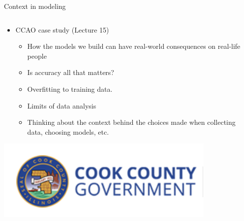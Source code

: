 \documentclass[aspectratio=169]{../latex_main/tntbeamer}  %
\begin{document}
	
	\begin{frame}{Context in modeling}
	          \begin{columns}
	            \begin{column}{.6\textwidth}
	            \vspace{.75cm}
	            \begin{itemize}
	                \item CCAO case study (Lecture 15)
	                \begin{itemize}
	                    \item How the models we build can have real-world consequences on real-life people
	                    \item Is accuracy all that matters?
	                    \item Overfitting to training data.
	                    \item Limits of data analysis
	                    \item Thinking about the context behind the choices made when collecting data, choosing models, etc.
	                \end{itemize}
	            \end{itemize}
	            \begin{center}
	                \includegraphics[scale=.5]{Bild8}
	            \end{center}
	            \end{column}
	            

\end{columns}
\end{frame}
\end{document}
